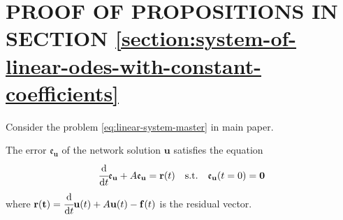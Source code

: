 \documentclass[accepted]{uai2023}
\newcommand{\vect}[1]{\mathbf{#1}}
\newcommand{\dt}[1]{\cfrac{\mathrm{d} #1}{\mathrm{d} t}}
\newcommand{\Err}{\mathfrak{e}}
\begin{document}
\section{PROOF OF PROPOSITIONS IN SECTION \ref{section:system-of-linear-odes-with-constant-coefficients}}
    Consider the problem \ref{eq:linear-system-master} in main paper. 

    The error $\Err_{\vect{u}}$ of the network solution $\vect{u}$ satisfies the equation
    \begin{equation}\label{eq:system-err-equation}
        \dt{}\Err_{\vect{u}} + A\Err_{\vect{u}} = \vect{r}(t) \quad \text{s.t.} \quad \Err_\vect{u}(t=0) = \vect{0}
    \end{equation}
    where $\vect{r(t)} = \dt{}\vect{u}(t) + A\vect{u}(t) - \vect{f}(t)$ is the residual vector.
\end{document}
